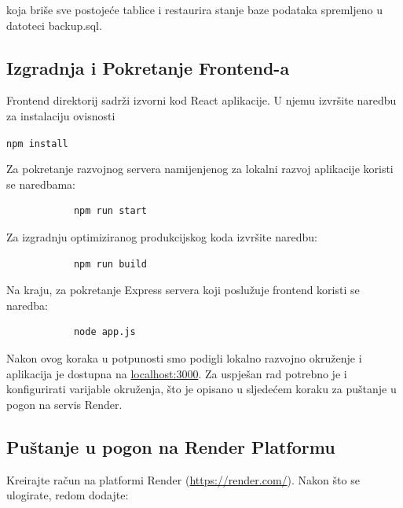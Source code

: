 			koja briše sve postojeće tablice i restaurira stanje baze podataka spremljeno u datoteci backup.sql.
			
			\subsection{Izgradnja i Pokretanje Frontend-a}
			
			Frontend direktorij sadrži izvorni kod React aplikacije. U njemu izvršite naredbu za instalaciju ovisnosti 

			\texttt{npm install}

			Za pokretanje razvojnog servera namijenjenog za lokalni razvoj aplikacije koristi se naredbama:
			
			\begin{verbatim}
			npm run start
			\end{verbatim}
			
			Za izgradnju optimiziranog produkcijskog koda izvršite naredbu:
			
			\begin{verbatim}
			npm run build
			\end{verbatim}
			
			Na kraju, za pokretanje Express servera koji poslužuje frontend koristi se naredba:
			
			\begin{verbatim}
			node app.js
			\end{verbatim}
			
			Nakon ovog koraka u potpunosti smo podigli lokalno razvojno okruženje i aplikacija je dostupna na \url{localhost:3000}. Za uspješan rad potrebno je i konfigurirati varijable okruženja, što je opisano u sljedećem koraku za puštanje u pogon na servis Render.
			
			\subsection{Puštanje u pogon na Render Platformu}
			
			Kreirajte račun na platformi Render (\url{https://render.com/}). Nakon što se ulogirate, redom dodajte:
			
